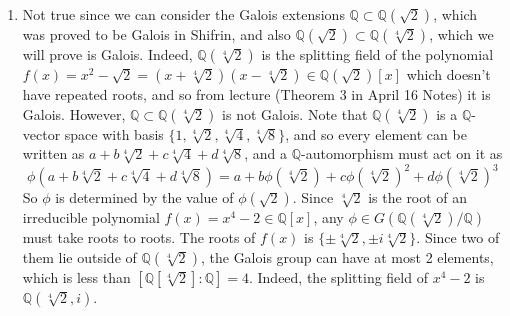 \begin{solution}
\begin{enumerate}
      \item Not true since we can consider the Galois extensions $\mathbb{Q} \subset \mathbb{Q}(\sqrt{2})$, which was proved to be Galois in Shifrin, and also $\mathbb{Q}(\sqrt{2}) \subset \mathbb{Q}(\sqrt[4]{2})$, which we will prove is Galois. Indeed, $\mathbb{Q}(\sqrt[4]{2})$ is the splitting field of the polynomial $f(x) = x^2 - \sqrt{2} = (x + \sqrt[4]{2}) (x - \sqrt[4]{2}) \in \mathbb{Q}(\sqrt{2})[x]$ which doesn't have repeated roots, and so from lecture (Theorem 3 in April 16 Notes) it is Galois. However, $\mathbb{Q} \subset \mathbb{Q}(\sqrt[4]{2})$ is not Galois. Note that $\mathbb{Q}(\sqrt[4]{2})$ is a $\mathbb{Q}$-vector space with basis $\{1, \sqrt[4]{2}, \sqrt[4]{4}, \sqrt[4]{8}\}$, and so every element can be written as $a + b \sqrt[4]{2} + c \sqrt[4]{4} + d \sqrt[4]{8}$, and a $\mathbb{Q}$-automorphism must act on it as 
      \begin{equation}
        \phi(a + b \sqrt[4]{2} + c \sqrt[4]{4} + d \sqrt[4]{8}) = a + b \phi(\sqrt[4]{2}) + c \phi(\sqrt[4]{2})^2 + d \phi(\sqrt[4]{2})^3
      \end{equation}
      So $\phi$ is determined by the value of $\phi(\sqrt{2})$. Since $\sqrt[4]{2}$ is the root of an irreducible polynomial $f(x) = x^4 - 2 \in \mathbb{Q}[x]$, any $\phi \in G(\mathbb{Q}(\sqrt[4]{2})/\mathbb{Q})$ must take roots to roots. The roots of $f(x)$ is $\{\pm \sqrt[4]{2}, \pm i \sqrt[4]{2}\}$. Since two of them lie outside of $\mathbb{Q}(\sqrt[4]{2})$, the Galois group can have at most 2 elements, which is less than  $[\mathbb{Q}[\sqrt[4]{2}]: \mathbb{Q}] = 4$. Indeed, the splitting field of $x^4 - 2$ is $\mathbb{Q}(\sqrt[4]{2}, i)$. 
    \end{enumerate}
  \end{solution}

